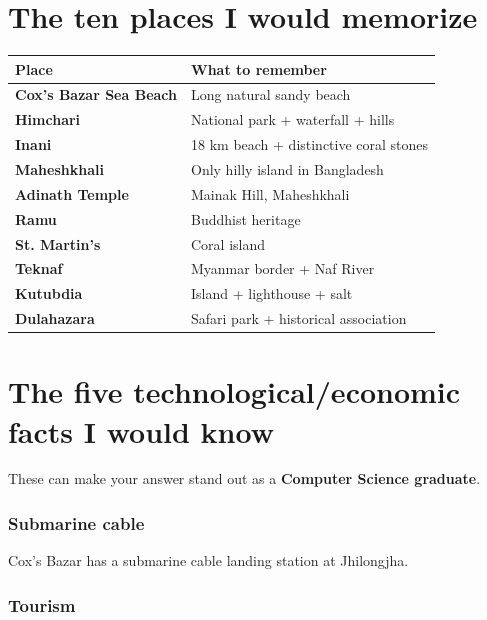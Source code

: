 \medskip

\section{The ten places I would memorize}

\begin{center}
\setlength{\tabcolsep}{6pt}
\renewcommand{\arraystretch}{1.2}
\begin{tabular}{|l|l|}
\hline
\textbf{Place} & \textbf{What to remember} \\
\hline
\textbf{Cox's Bazar Sea Beach} & Long natural sandy beach \\
\textbf{Himchari} & National park + waterfall + hills \\
\textbf{Inani} & 18 km beach + distinctive coral stones \\
\textbf{Maheshkhali} & Only hilly island in Bangladesh \\
\textbf{Adinath Temple} & Mainak Hill, Maheshkhali \\
\textbf{Ramu} & Buddhist heritage \\
\textbf{St. Martin's} & Coral island \\
\textbf{Teknaf} & Myanmar border + Naf River \\
\textbf{Kutubdia} & Island + lighthouse + salt \\
\textbf{Dulahazara} & Safari park + historical association \\
\hline
\end{tabular}
\end{center}

\medskip

\section{The five technological/economic facts I would know}

These can make your answer stand out as a \textbf{Computer Science graduate}.

\subsubsection{Submarine cable}

Cox's Bazar has a submarine cable landing station at Jhilongjha.

\subsubsection{Tourism}

